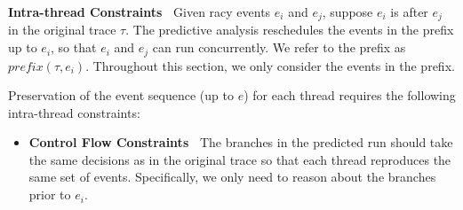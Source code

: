 {\bf Intra-thread Constraints\ } Given racy events $e_i$ and $e_j$, suppose $e_i$ is after $e_j$ in the original trace $\tau$. The predictive analysis reschedules the events in the prefix up to $e_i$, so that $e_i$ and $e_j$ can run concurrently. We refer to the prefix as $prefix(\tau, e_i)$. Throughout this section, we only consider the events in the prefix. 

Preservation of the event sequence (up to $e$) for each thread requires the following intra-thread constraints:

\begin{itemize}
\item {\bf Control Flow Constraints\ } The branches in the predicted run should take the same decisions as in the original trace so that each thread reproduces the same set of events.  Specifically, we only need to reason about the branches prior to $e_i$.


\end{itemize}
